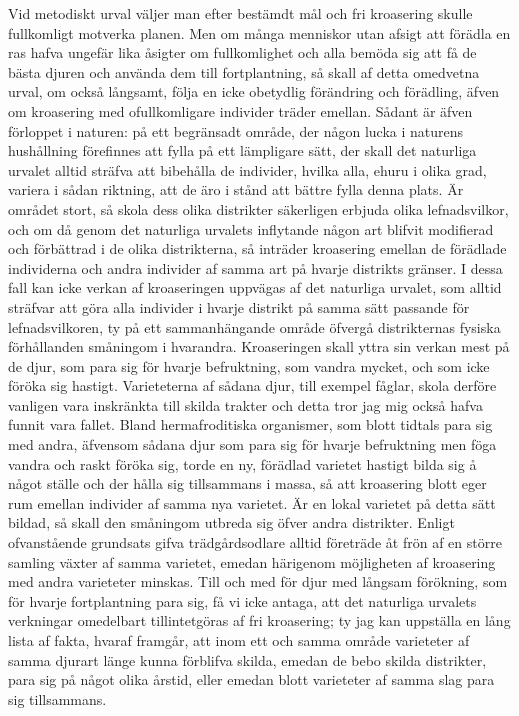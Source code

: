 Vid metodiskt urval väljer man efter bestämdt mål och fri kroasering skulle fullkomligt motverka planen. Men om många menniskor utan afsigt att förädla en ras hafva ungefär lika åsigter om fullkomlighet och alla bemöda sig att få de bästa djuren och använda dem till fortplantning, så skall af detta omedvetna urval, om också långsamt, följa en icke obetydlig förändring och förädling, äfven om kroasering med ofullkomligare individer träder emellan. Sådant är äfven förloppet i naturen: på ett begränsadt område, der någon lucka i naturens hushållning förefinnes att fylla på ett lämpligare sätt, der skall det naturliga urvalet alltid sträfva att bibehålla de individer, hvilka alla, ehuru i olika grad, variera i sådan riktning, att de äro i stånd att bättre fylla denna plats. Är området stort, så skola dess olika distrikter säkerligen erbjuda olika lefnadsvilkor, och om då genom det naturliga urvalets inflytande någon art blifvit modifierad och förbättrad i de olika distrikterna, så inträder kroasering emellan de förädlade individerna och andra individer af samma art på hvarje distrikts gränser. I dessa fall kan icke verkan af kroaseringen uppvägas af det naturliga urvalet, som alltid sträfvar att göra alla individer i hvarje distrikt på samma sätt passande för lefnadsvilkoren, ty på ett sammanhängande område öfvergå distrikternas fysiska förhållanden småningom i hvarandra. Kroaseringen skall yttra sin verkan mest på de djur, som para sig för hvarje befruktning, som vandra mycket, och som icke föröka sig hastigt. Varieteterna af sådana djur, till exempel fåglar, skola derföre vanligen vara inskränkta till skilda trakter och detta tror jag mig också hafva funnit vara fallet. Bland hermafroditiska organismer, som blott tidtals para sig med andra, äfvensom sådana djur som para sig för hvarje befruktning men föga vandra och raskt föröka sig, torde en ny, förädlad varietet hastigt bilda sig å något ställe och der hålla sig tillsammans i massa, så att kroasering blott eger rum emellan individer af samma nya varietet. Är en lokal varietet på detta sätt bildad, så skall den småningom utbreda sig öfver andra distrikter. Enligt ofvanstående grundsats gifva trädgårdsodlare alltid företräde åt frön af en större samling växter af samma varietet, emedan härigenom möjligheten af kroasering med andra varieteter minskas.
Till och med för djur med långsam förökning, som för hvarje fortplantning para sig, få vi icke antaga, att det naturliga urvalets verkningar omedelbart tillintetgöras af fri kroasering; ty jag kan uppställa en lång lista af fakta, hvaraf framgår, att inom ett och samma område varieteter af samma djurart länge kunna förblifva skilda, emedan de bebo skilda distrikter, para sig på något olika årstid, eller emedan blott varieteter af samma slag para sig tillsammans.

